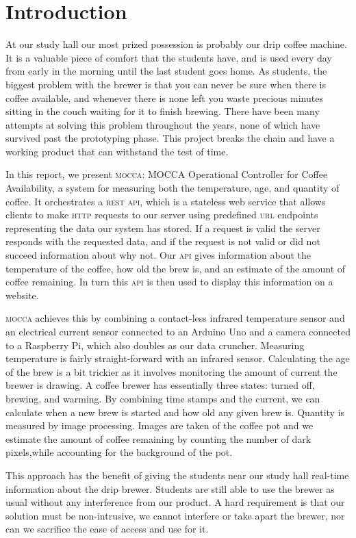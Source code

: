 \documentclass[12pt,a4paper,oneside,article]{memoir}
\numberwithin{equation}{chapter}
\begin{document}
\section{Introduction}\label{sec:introduction}
At our study hall our most prized possession is probably our drip coffee
machine. It is a valuable piece of comfort that the students have, and is used
every day from early in the morning until the last student goes home. As
students, the biggest problem with the brewer is that you can never be sure when
there is coffee available, and whenever there is none left you waste precious
minutes sitting in the couch waiting for it to finish brewing. There have been
many attempts at solving this problem throughout the years, none of which have
survived past the prototyping phase. This project breaks the chain and have a
working product that can withstand the test of time.

In this report, we present \textsc{mocca}: MOCCA Operational Controller for
Coffee Availability, a system for measuring both the temperature, age, and
quantity of coffee. It orchestrates a \textsc{rest api}, which is a stateless
web service that allows clients to make \textsc{http} requests to our server
using predefined \textsc{url} endpoints representing the data our system has
stored. If a request is valid the server responds with the requested data, and
if the request is not valid or did not succeed information about why not. Our
\textsc{api} gives information about the temperature of the coffee, how old the
brew is, and an estimate of the amount of coffee remaining. In turn this
\textsc{api} is then used to display this information on a website.

\textsc{mocca} achieves this by combining a contact-less infrared temperature
sensor and an electrical current sensor connected to an Arduino Uno and a camera
connected to a Raspberry Pi, which also doubles as our data cruncher. Measuring
temperature is fairly straight-forward with an infrared sensor. Calculating the
age of the brew is a bit trickier as it involves monitoring the amount of
current the brewer is drawing. A coffee brewer has essentially three states:
turned off, brewing, and warming. By combining time stamps and the current, we
can calculate when a new brew is started and how old any given brew is. Quantity
is measured by image processing. Images are taken of the coffee pot and we
estimate the amount of coffee remaining by counting the number of dark
pixels,while accounting for the background of the pot.

This approach has the benefit of giving the students near our study hall
real-time information about the drip brewer. Students are still able to use the
brewer as usual without any interference from our product. A hard requirement is
that our solution must be non-intrusive, we cannot interfere or take apart the
brewer, nor can we sacrifice the ease of access and use for it.
\end{document}
